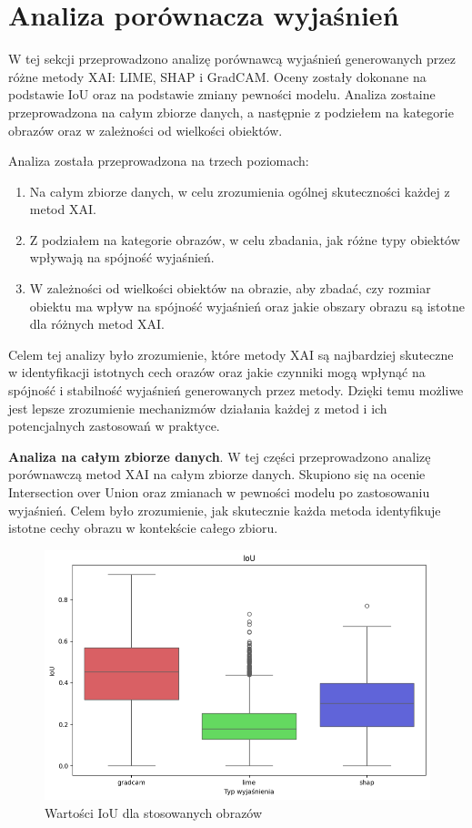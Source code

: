 \section*{Analiza porównacza wyjaśnień}
W tej sekcji przeprowadzono analizę porównawcą wyjaśnień generowanych przez różne metody XAI: LIME, SHAP i GradCAM.
Oceny zostały dokonane na podstawie IoU oraz na podstawie zmiany pewności modelu.
Analiza zostaine przeprowadzona na całym zbiorze danych, a następnie z podziełem na kategorie obrazów oraz w zależności od wielkości obiektów.

Analiza została przeprowadzona na trzech poziomach:
\begin{enumerate}
	\item Na całym zbiorze danych, w celu zrozumienia ogólnej skuteczności każdej z metod XAI.
	\item Z podziałem na kategorie obrazów, w celu zbadania, jak różne typy obiektów wpływają na spójność wyjaśnień.
	\item W zależności od wielkości obiektów na obrazie, aby zbadać, czy rozmiar obiektu ma wpływ na spójność wyjaśnień oraz jakie obszary obrazu są istotne dla różnych metod XAI.
\end{enumerate}

Celem tej analizy było zrozumienie, które metody XAI są najbardziej skuteczne w identyfikacji istotnych cech orazów oraz jakie czynniki mogą wpłynąć na spójność i stabilność wyjaśnień generowanych przez metody.
Dzięki temu możliwe jest lepsze zrozumienie mechanizmów działania każdej z metod i ich potencjalnych zastosowań w praktyce.

\textbf{Analiza na całym zbiorze danych}.
W tej części przeprowadzono analizę porównawczą metod XAI na całym zbiorze danych.
Skupiono się na ocenie Intersection over Union oraz zmianach w pewności modelu po zastosowaniu wyjaśnień.
Celem było zrozumienie, jak skutecznie każda metoda identyfikuje istotne cechy obrazu w kontekście całego zbioru.

\begin{figure}
	\centering\includegraphics[width=.6\textwidth]{img/base_iou}
	\caption{Wartości IoU  dla stosowanych obrazów}  \label{rys:basiciou}
\end{figure}

